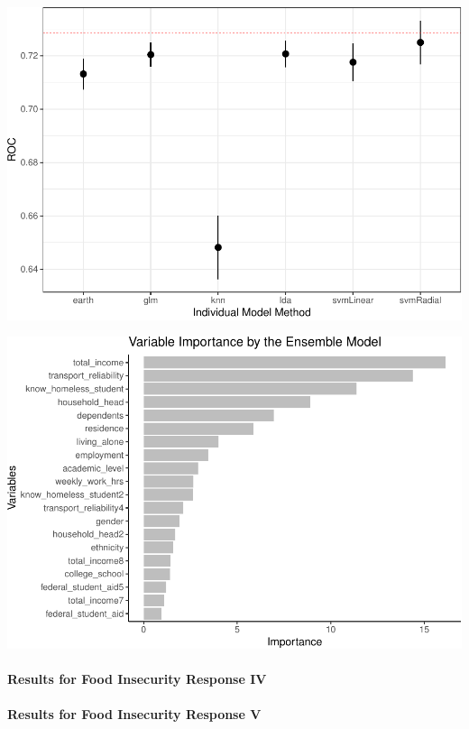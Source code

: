 \documentclass[
  10pt,
]{article}
\begin{document}
\begin{center}\includegraphics{phase2_report_files/figure-latex/unnamed-chunk-22-1} \end{center}

\begin{center}\includegraphics{phase2_report_files/figure-latex/unnamed-chunk-23-1} \end{center}

\hypertarget{results-for-food-insecurity-response-iv}{%
\paragraph{Results for Food Insecurity Response IV}\label{results-for-food-insecurity-response-iv}}

\hypertarget{results-for-food-insecurity-response-v}{%
\paragraph{Results for Food Insecurity Response V}\label{results-for-food-insecurity-response-v}}
\end{document}
